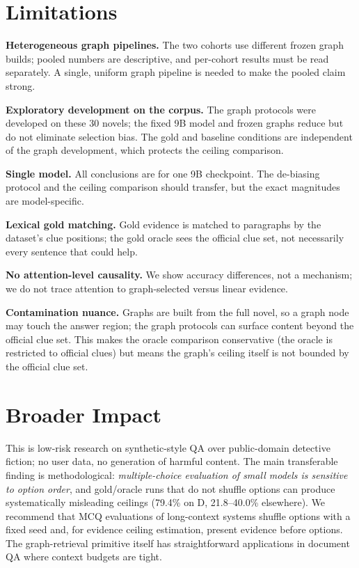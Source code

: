 \documentclass{article}
\begin{document}
\section{Limitations}
\label{sec:limitations}

\textbf{Heterogeneous graph pipelines.} The two cohorts use different frozen
graph builds; pooled numbers are descriptive, and per-cohort results must be
read separately. A single, uniform graph pipeline is needed to make the pooled
claim strong.

\textbf{Exploratory development on the corpus.} The graph protocols were
developed on these 30 novels; the fixed 9B model and frozen graphs reduce but do
not eliminate selection bias. The gold and baseline conditions are independent
of the graph development, which protects the ceiling comparison.

\textbf{Single model.} All conclusions are for one 9B checkpoint. The
de-biasing protocol and the ceiling comparison should transfer, but the exact
magnitudes are model-specific.

\textbf{Lexical gold matching.} Gold evidence is matched to paragraphs by the
dataset's clue positions; the gold oracle sees the official clue set, not
necessarily every sentence that could help.

\textbf{No attention-level causality.} We show accuracy differences, not a
mechanism; we do not trace attention to graph-selected versus linear evidence.

\textbf{Contamination nuance.} Graphs are built from the full novel, so a graph
node may touch the answer region; the graph protocols can surface content
beyond the official clue set. This makes the oracle comparison conservative
(the oracle is restricted to official clues) but means the graph's ceiling
itself is not bounded by the official clue set.

\section{Broader Impact}
\label{sec:impact}

This is low-risk research on synthetic-style QA over public-domain detective
fiction; no user data, no generation of harmful content. The main transferable
finding is methodological: \emph{multiple-choice evaluation of small models is
sensitive to option order}, and gold/oracle runs that do not shuffle options
can produce systematically misleading ceilings (79.4\% on D, 21.8--40.0\%
elsewhere). We recommend that MCQ evaluations of long-context systems shuffle
options with a fixed seed and, for evidence ceiling estimation, present
evidence before options. The graph-retrieval primitive itself has
straightforward applications in document QA where context budgets are tight.
\end{document}
